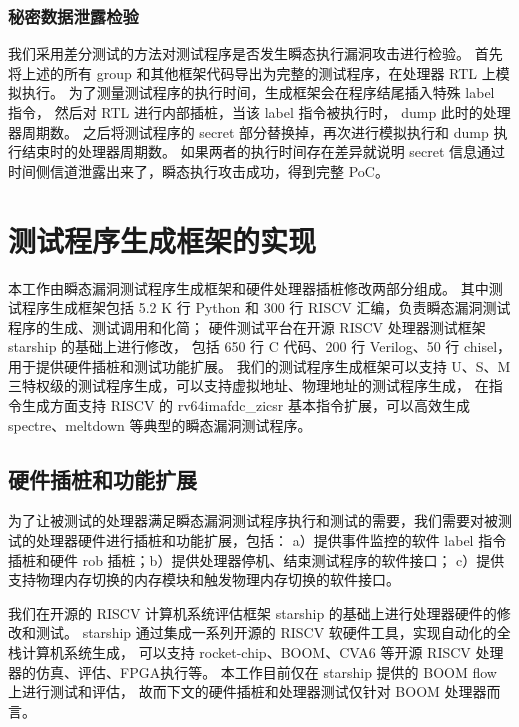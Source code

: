 \subsubsection{秘密数据泄露检验}

我们采用差分测试的方法对测试程序是否发生瞬态执行漏洞攻击进行检验。
首先将上述的所有 group 和其他框架代码导出为完整的测试程序，在处理器 RTL 上模拟执行。
为了测量测试程序的执行时间，生成框架会在程序结尾插入特殊 label 指令，
然后对 RTL 进行内部插桩，当该 label 指令被执行时， dump 此时的处理器周期数。
之后将测试程序的 secret 部分替换掉，再次进行模拟执行和 dump 执行结束时的处理器周期数。
如果两者的执行时间存在差异就说明 secret 信息通过时间侧信道泄露出来了，瞬态执行攻击成功，得到完整 PoC。

\cleardoublepage
\section{测试程序生成框架的实现}

本工作由瞬态漏洞测试程序生成框架和硬件处理器插桩修改两部分组成。
其中测试程序生成框架包括 5.2 K 行 Python 和 300 行 RISCV 汇编，负责瞬态漏洞测试程序的生成、测试调用和化简；
硬件测试平台在开源 RISCV 处理器测试框架 starship\cite{starship} 的基础上进行修改，
包括 650 行 C 代码、200 行 Verilog、50 行 chisel，用于提供硬件插桩和测试功能扩展。
我们的测试程序生成框架可以支持 U、S、M 三特权级的测试程序生成，可以支持虚拟地址、物理地址的测试程序生成，
在指令生成方面支持 RISCV 的 rv64imafdc\_zicsr 基本指令扩展，可以高效生成 spectre、meltdown 等典型的瞬态漏洞测试程序。\par

\subsection{硬件插桩和功能扩展}

为了让被测试的处理器满足瞬态漏洞测试程序执行和测试的需要，我们需要对被测试的处理器硬件进行插桩和功能扩展，包括：
a）提供事件监控的软件 label 指令插桩和硬件 rob 插桩；b）提供处理器停机、结束测试程序的软件接口；
c）提供支持物理内存切换的内存模块和触发物理内存切换的软件接口。\par

我们在开源的 RISCV 计算机系统评估框架 starship\cite{starship} 的基础上进行处理器硬件的修改和测试。
starship 通过集成一系列开源的 RISCV 软硬件工具，实现自动化的全栈计算机系统生成，
可以支持 rocket-chip\cite{rocket-chip}、BOOM\cite{celio2017boomv2}、CVA6\cite{cva6} 等开源 RISCV 处理器的仿真、评估、FPGA执行等。
本工作目前仅在 starship 提供的 BOOM flow 上进行测试和评估，
故而下文的硬件插桩和处理器测试仅针对 BOOM 处理器而言。\par

